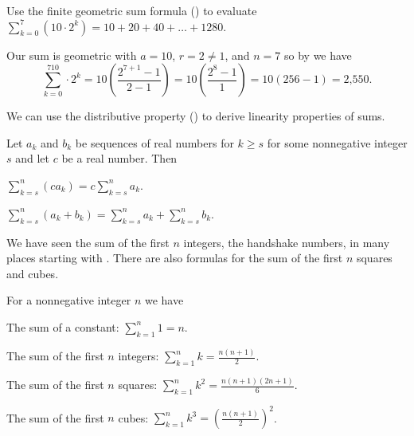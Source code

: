 \begin{exam}
\label{exam_finite_geom_sum}
    Use the finite geometric sum formula () to evaluate $\displaystyle \sum_{k=0}^7(10\cdot2^k)=10 + 20 + 40 + \ldots + 1280$.
        \begin{soln}
            Our sum is geometric with $a=10$, $r=2 \neq 1$, and $n=7$ so by  we have 
            $$\sum_{k=0}^710\cdot2^k = 10 \left(\frac{2^{7+1}-1}{2-1}\right) = 10 \left(\frac{2^8-1}{1}\right) = 10(256-1) = \text{2,550}.$$
        \end{soln}
\end{exam}

We can use the distributive property () to derive linearity properties of sums.

\begin{thm}
\label{thm_linearity_sums} 
    Let $a_k$ and $b_k$ be sequences of real numbers for $k \ge s$ for some nonnegative integer $s$ and let $c$ be a real number. Then
        \begin{apart}
            \item \label{part_constant_times_sum} $\displaystyle \sum_{k=s}^n(ca_k)=c\sum_{k=s}^na_k.$  
            \item \label{part_sum_of_sum}  $\displaystyle \sum_{k=s}^n(a_k+b_k)=\sum_{k=s}^na_k+\sum_{k=s}^nb_k.$   
        \end{apart}
\end{thm}

We have seen the sum of the first $n$ integers, the handshake numbers, in many places starting with .  There are also formulas for the sum of the first $n$ squares and cubes.

\begin{thm}
\label{thm_sum_formula_polys}
    For a nonnegative integer $n$ we have
        \begin{apart}
            \item \label{part_sum_constant} The sum of a constant: $\displaystyle \sum_{k=1}^n1=n$.
            \item \label{part_sum_hs} The sum of the first $n$ integers: $\displaystyle \sum_{k=1}^nk = \frac{n(n+1)}{2}$.
            \item \label{part_sum_squares} The sum of the first $n$ squares: $\displaystyle \sum_{k=1}^nk^2 = \frac{n(n+1)(2n+1)}{6}$.
            \item \label{part_sum_cubes} The sum of the first $n$ cubes: $\displaystyle \sum_{k=1}^nk^3 = \left(\frac{n(n+1)}{2}\right)^2$.
        \end{apart}
\end{thm}

